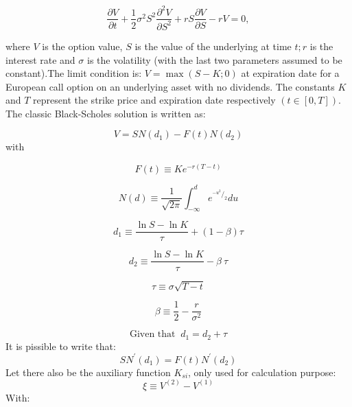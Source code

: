 \documentclass[a4 paper, 12pt]{report}
\newcommand*\rfrac[2]{{}^{#1}\!/_{#2}}
\theoremstyle{plain}
\begin{document}
\begin{equation}\label{3.1}
\frac{\partial V}{\partial t}+\frac{1}{2}\sigma^2S^2\frac{\partial^2 V}{\partial S^2}+rS\frac{\partial V}{\partial S} - rV = 0,
\end{equation}

where $V$ is the option value, $S$ is the value of the underlying at time $t; r$ is the interest rate and $\sigma$ is the volatility (with the last two parameters assumed to be constant).The limit condition is: $V = \max (S - K; 0)$ at expiration date for a European call option on an underlying asset with no dividends. The constants $K$ and $T$ represent the strike price and expiration date respectively $(t \in [0,T]).$\\
The classic Black-Scholes solution is written as:

\begin{equation}\label{3.2}
V = SN(d_1) - F(t)N(d_2)
\end{equation}
with

\begin{equation}\label{3.3}
F(t)\equiv Ke^{-r(T-t)}
\end{equation}

\begin{equation}\label{3.4}
N(d)\equiv\frac{1}{\sqrt{2\pi}}\int_{-\infty}^d e^{\rfrac{-u^2}{2}}du
\end{equation}

\begin{equation}\label{3.5}
d_1\equiv \frac{\ln S - \ln K}{\tau}+(1-\beta)\tau
\end{equation}


\begin{equation}\label{3.6}
d_2\equiv\frac{\ln S - \ln K}{\tau} - \beta~\tau
\end{equation}

\begin{equation}\label{3.7}
\tau\equiv \sigma\sqrt{T-t}
\end{equation}

\begin{equation}\label{3.8}
\beta\equiv \frac{1}{2} - \frac{r}{\sigma^2}
\end{equation}

\begin{equation}\label{3.9}
\mbox{Given that  }~ d_1 = d_2+\tau
\end{equation}
It is pissible to write that:
\begin{equation}\label{3.10}
SN^\prime(d_1) = F(t)N^\prime(d_2)
\end{equation}
Let there also be the auxiliary function $K_{si}$, only used for calculation purpose:
\begin{equation}\label{3.11}
\xi\equiv V^{(2)} - V^{(1)}
\end{equation}
With:
\end{document}

